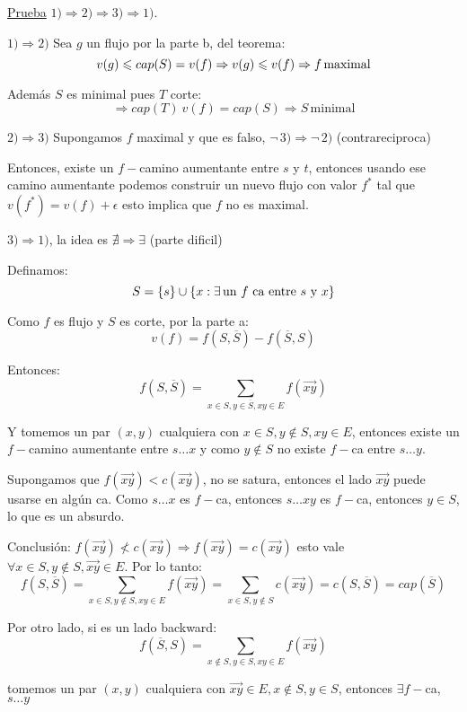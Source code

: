 \documentclass[12pt,a4paper]{article}
\begin{document}
\underline{Prueba} $1) \Rightarrow 2) \Rightarrow 3) \Rightarrow 1)$.
\medskip

$1) \Rightarrow 2)$ Sea $g$ un flujo por la parte b, del teorema:
$$v(g) \leqslant cap(S) = v(f) \Rightarrow v(g) \leqslant v(f) \Rightarrow f\, \text{maximal}$$

Además $S$ es minimal pues $T$ corte:
$$\Rightarrow cap(T) \> v(f) = cap(S) \Rightarrow S\, \text{minimal}$$

$2) \Rightarrow 3)$ Supongamos $f$ maximal y que es falso, $\lnot\, 3) \Rightarrow \lnot\, 2)$ (contrareciproca)
\medskip

Entonces, existe un $f-$camino aumentante entre $s$ y $t$, entonces usando ese camino aumentante 
podemos construir un nuevo flujo con valor $f^{*}$ tal que $v(f^{*}) = v(f) + \epsilon$ 
esto implica que $f$ no es maximal.
\medskip

$3) \Rightarrow 1)$, la idea es $\nexists \Rightarrow \exists$ (parte dificil)
\medskip

Definamos:
$$S = \left\lbrace s \right\rbrace \cup \left\lbrace x: \exists \, \text{un $f$ ca entre $s$ y $x$} \right\rbrace$$

Como $f$ es flujo y $S$ es corte, por la parte a:
$$v(f) = f(S,\overline{S}) - f(\overline{S},S)$$

Entonces:
$$f(S,\overline{S}) = \sum_{x\in S, y\in \overline{S}, xy \in E} f(\overrightarrow{xy})$$

Y tomemos un par $(x,y)$ cualquiera con $x\in S, y \notin S, xy \in E$, entonces 
existe un $f-$camino aumentante entre $s\ldots x$ y como $y \notin S$ no existe $f-$ca entre $s\ldots y$.
\medskip

Supongamos que $f(\overrightarrow{xy}) < c(\overrightarrow{xy})$, no se satura, 
entonces el lado $\overrightarrow{xy}$ puede usarse en algún ca. Como $s\ldots x$ 
es $f-$ca, entonces $s\ldots xy$ es $f-$ca, entonces $y \in S$, lo que es un absurdo.
\medskip

Conclusión: $f(\overrightarrow{xy}) \nless c(\overrightarrow{xy}) \Rightarrow f(\overrightarrow{xy}) = c(\overrightarrow{xy})$ 
esto vale $\forall x\in S, y\notin S, \overrightarrow{xy}\in E$. Por lo tanto:
$$f(S,\overline{S}) = \sum_{x\in S, y\notin S, xy \in E} f(\overrightarrow{xy}) = \sum_{x\in S, y\notin S}c(\overrightarrow{xy}) = c(S,\overline{S}) = cap(\overline{S})$$

Por otro lado, si es un lado backward:
$$f(\overline{S},S) = \sum_{x\notin S, y\in S, xy \in E} f(\overrightarrow{xy})$$

tomemos un par $(x,y)$ cualquiera con $\overrightarrow{xy} \in E, x\notin S, y\in S$, 
entonces $\exists f-$ca, $s\ldots y$
\medskip
\end{document}
